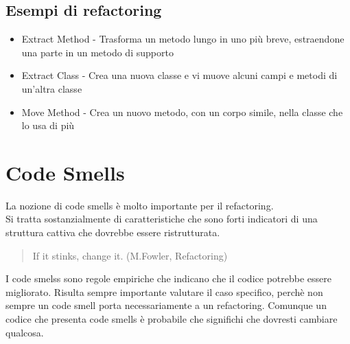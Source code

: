 \subsection{Esempi di refactoring}
\begin{itemize}
    \item Extract Method - Trasforma un metodo lungo in uno più breve, estraendone una parte in
    un metodo di supporto
    \item Extract Class - Crea una nuova classe e vi muove alcuni campi e metodi di un'altra classe
    \item Move Method - Crea un nuovo metodo, con un corpo simile, nella classe che lo
    usa di più
\end{itemize}
\section{Code Smells}
La nozione di code smells è molto importante per il refactoring.\\
Si tratta sostanzialmente di caratteristiche che sono forti indicatori di una struttura
cattiva che dovrebbe essere ristrutturata.\\
\begin{quote}
    If it stinks, change it. (M.Fowler, Refactoring)
\end{quote}
I code smelss sono regole empiriche che indicano che il codice potrebbe essere migliorato.
Risulta sempre importante valutare il caso specifico, perchè non sempre un code smell porta
necessariamente a un refactoring. Comunque un codice che presenta code smells è probabile
che significhi che dovresti cambiare qualcosa.\\
